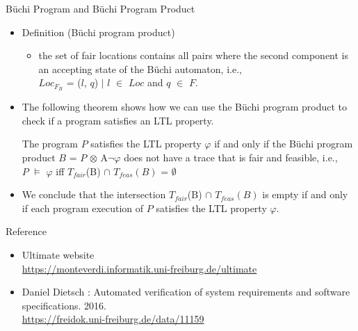 \documentclass[12pt]{beamer}
\newcommand{\ultimateURL}{\url{https://monteverdi.informatik.uni-freiburg.de/ultimate}}
\begin{document}
\begin{frame}{B\"uchi Program and B\"uchi Program Product}
  	\begin{itemize}
		\item Definition (B\"uchi program product)
		\begin{itemize}
			\item the set of fair locations contains all pairs where the second component is an accepting state of the B\"uchi automaton, i.e., \\ $Loc_{{F}_{B}}$ = {($l$, $q$) $\mid$ $l$ $\in$ $Loc$ and $q$ $\in$ $F$}.
		\end{itemize}
		\item The following theorem shows how we can use the B\"uchi program product to check if a program satisfies an LTL property.
		\begin{theorem}
			The program $P$ satisfies the LTL property $\varphi$ if and only if the Büchi program product $B$ = $P$ $\otimes$ A$\neg\varphi$  does not have a trace that is fair and feasible, i.e.,\\
			$P$ $\models$ $\varphi$ iff $T_{fair}$(B) $\cap$ $T_{feas}(B)$ = $\emptyset$
		\end{theorem}
		\item We conclude that the intersection $T_{fair}$(B) $\cap$ $T_{feas}(B)$ is empty if and only if each program execution of $P$ satisfies the LTL property $\varphi$.
  	\end{itemize}
\end{frame}



\begin{frame}{Reference}
	\begin{itemize}
		\item Ultimate website\\
		\ultimateURL
		\item Daniel Dietsch : Automated verification of system requirements and software specifications. 2016.\\
		\url{https://freidok.uni-freiburg.de/data/11159}
	\end{itemize}
\end{frame}
\end{document}
